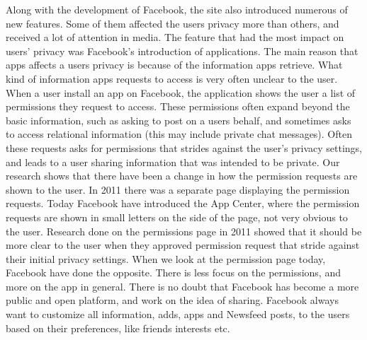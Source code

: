 Along with the development of Facebook, the site also introduced numerous of new features. Some of them affected the users privacy more than others, and received a lot of attention in media. The feature that had the most impact on users' privacy was Facebook's introduction of applications. 
The main reason that apps affects a users privacy is because of the information apps retrieve. What kind of information apps requests to access is very often unclear to the user. When a user install an app on Facebook, the application shows the user a list of permissions they request to access. These permissions often expand beyond the basic information, such as asking to post on a users behalf, and sometimes asks to access relational information (this may include private chat messages). Often these requests asks for permissions that strides against the user's privacy settings, and leads to a user sharing information that was intended to be private. Our research shows that there have been a change in how the permission requests are shown to the user. In 2011 there was a separate page displaying the permission requests. Today Facebook have introduced the App Center, where the permission requests are shown in small letters on the side of the page, not very obvious to the user. Research done on the permissions page in 2011 showed that it should be more clear to the user when they approved permission request that stride against their initial privacy settings. When we look at the permission page today, Facebook have done the opposite. There is less focus on the permissions, and more on the app in general.  
There is no doubt that Facebook has become a more public and open platform, and work on the idea of sharing. Facebook always want to customize all information, adds, apps and Newsfeed posts, to the users based on their preferences, like friends interests etc. 

